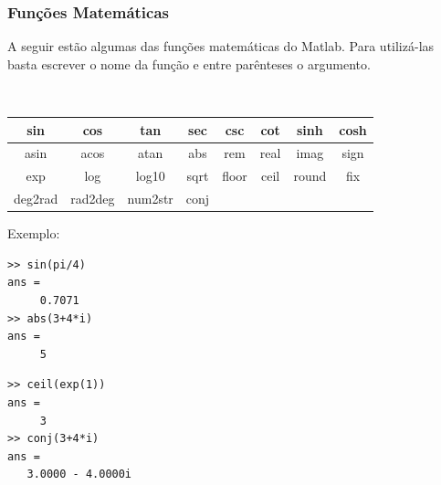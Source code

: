 \documentclass{beamer}
\newcommand{\ssiz}{\scriptsize}
\begin{document}
\begin{frame}[fragile]
 \frametitle{Fun\c{c}\~oes Matem\'aticas}

A seguir est\~ao algumas das fun\c{c}\~oes matem\'aticas do Matlab. Para utiliz\'a-las basta escrever o nome da fun\c{c}\~ao e entre par\^enteses o argumento.

{\scriptsize \tt
\begin{center}
\begin{tabular}{|c|c|c|c|c|c|c|c|}
\hline
sin  & cos  & tan   & sec  & csc   & cot  & sinh & cosh \\ \hline
asin & acos & atan  & abs  & rem   & real & imag & sign \\ \hline
exp  & log  & log10 & sqrt & floor & ceil & round & fix \\ \hline
deg2rad & rad2deg & num2str & conj & & & & \\ \hline
\end{tabular}
\end{center}
}
\pause
Exemplo:
{\ssiz
\begin{center}
\begin{minipage}{4 cm}
\begin{verbatim}
>> sin(pi/4)
ans =
     0.7071
>> abs(3+4*i)
ans =
     5
\end{verbatim}
\end{minipage}
\begin{minipage}{4 cm}
\begin{verbatim}
>> ceil(exp(1))
ans =
     3
>> conj(3+4*i)
ans =
   3.0000 - 4.0000i
\end{verbatim}
\end{minipage}
\end{center}
}

\end{frame}

\section[Exerc\'icios]{}
\end{document}
